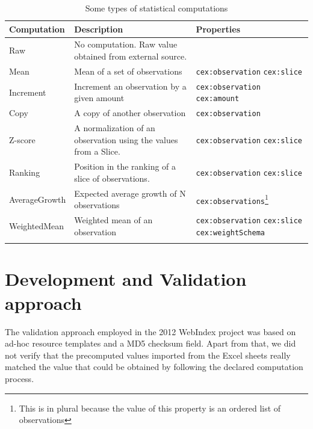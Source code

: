 \documentclass{llncs}
\begin{document}
\begin{table}[t]
\label{table:computations}
\begin{center}
\begin{tabular}{ p{} p{} p{}}
\toprule
Computation & Description & Properties \\
\hline
Raw			& No computation. Raw value obtained from external source.
			&  \\
Mean	    & Mean of a set of observations 
			& \lstinline|cex:observation| \newline 
			  \lstinline|cex:slice| \\
Increment	& Increment an observation by a given amount 
			& \lstinline|cex:observation| \newline 
			  \lstinline|cex:amount|  \\
Copy		& A copy of another observation 
			& \lstinline|cex:observation| \\
Z-score		& A normalization of an observation using the values from a Slice. 
			& \lstinline|cex:observation| \newline 
			  \lstinline|cex:slice| \\
Ranking		& Position in the ranking of a slice of observations. 
			& \lstinline|cex:observation| \newline 
			  \lstinline|cex:slice| \\
AverageGrowth & Expected average growth of N observations
			  & \lstinline|cex:observations|\footnote{This is in plural because the value of this property is an ordered list of observations} \\
WeightedMean & Weighted mean of an observation
			& \lstinline|cex:observation| \newline
			  \lstinline|cex:slice|       \newline
			  \lstinline|cex:weightSchema| \\
\bottomrule\\
\end{tabular}
\caption{Some types of statistical computations}
\end{center}
\end{table}

\section{Development and Validation approach}

The validation approach employed in the 2012 WebIndex project was based on ad-hoc resource templates and a MD5 checksum field. 
 Apart from that, we did not verify that the precomputed values imported from
 the Excel sheets really matched the value that could be obtained by 
 following the declared computation process.
\end{document}
